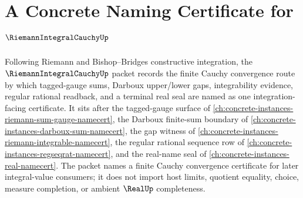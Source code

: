 \chapter{A Concrete Naming Certificate for $\RiemannIntegralCauchyUp$}
\label{ch:concrete-instances-riemann-integral-cauchy-namecert}

Following Riemann and Bishop--Bridges constructive integration, the $\RiemannIntegralCauchyUp$ packet records the finite Cauchy convergence route by which tagged-gauge sums, Darboux upper/lower gaps, integrability evidence, regular rational readback, and a terminal real seal are named as one integration-facing certificate. It sits after the tagged-gauge surface of \autoref{ch:concrete-instances-riemann-sum-gauge-namecert}, the Darboux finite-sum boundary of \autoref{ch:concrete-instances-darboux-sum-namecert}, the gap witness of \autoref{ch:concrete-instances-riemann-integrable-namecert}, the regular rational sequence row of \autoref{ch:concrete-instances-regseqrat-namecert}, and the real-name seal of \autoref{ch:concrete-instances-real-namecert}. The packet names a finite Cauchy convergence certificate for later integral-value consumers; it does not import host limits, quotient equality, choice, measure completion, or ambient $\RealUp$ completeness.

